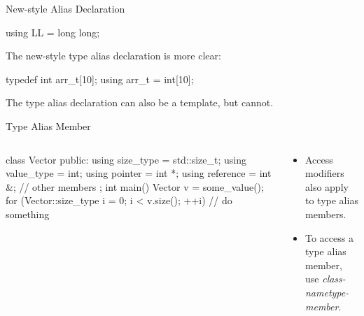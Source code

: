 \documentclass{beamer}
\begin{document}
\begin{frame}[fragile]{New-style Alias Declaration}
    \begin{cpp}
using LL = long long;
    \end{cpp}
    The new-style type alias declaration is more clear:
    \begin{cpp}
typedef int arr_t[10];
using arr_t = int[10];
    \end{cpp}
    The  type alias declaration can also be a template, but  cannot.
\end{frame}

\begin{frame}[fragile]{Type Alias Member}
    \begin{columns}
        \begin{column}{0.6\linewidth}
            \begin{cpp}
class Vector {
 public:
  using size_type = std::size_t;
  using value_type = int;
  using pointer = int *;
  using reference = int &;
  // other members
};
int main() {
  Vector v = some_value();
  for (Vector::size_type i = 0;
       i < v.size(); ++i)
    // do something
}
            \end{cpp}
        \end{column}
        \begin{column}{0.5\linewidth}
            \begin{itemize}
                \item Access modifiers also apply to type alias members.
                \item To access a type alias member, use \textit{class-name}\ttt{::}\textit{type-member}.
            \end{itemize}
        \end{column}
    \end{columns}
\end{frame}
\end{document}
